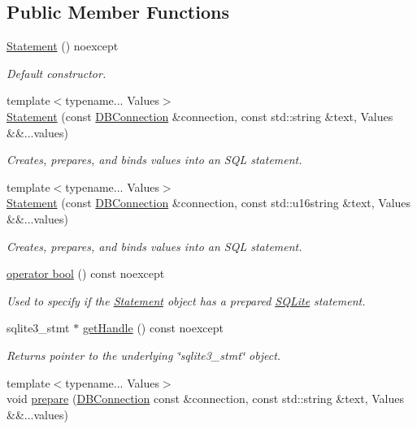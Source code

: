 \subsection*{Public Member Functions}
\begin{DoxyCompactItemize}
\item 
\hyperlink{a00013_a1c724c3934925a5988aa83909857589c}{Statement} () noexcept
\begin{DoxyCompactList}\small\item\em Default constructor. \end{DoxyCompactList}\item 
{\footnotesize template$<$typename... Values$>$ }\\\hyperlink{a00013_ac4f1af971f094f30c445bcc18ffc4e27}{Statement} (const \hyperlink{a00004}{D\-B\-Connection} \&connection, const std\-::string \&text, Values \&\&...values)
\begin{DoxyCompactList}\small\item\em Creates, prepares, and binds values into an S\-Q\-L statement. \end{DoxyCompactList}\item 
{\footnotesize template$<$typename... Values$>$ }\\\hyperlink{a00013_a3857ee340dd2769fafe10259cf4858a3}{Statement} (const \hyperlink{a00004}{D\-B\-Connection} \&connection, const std\-::u16string \&text, Values \&\&...values)
\begin{DoxyCompactList}\small\item\em Creates, prepares, and binds values into an S\-Q\-L statement. \end{DoxyCompactList}\item 
\hyperlink{a00013_a3b7793f1490a321159690cf096ec74d6}{operator bool} () const noexcept
\begin{DoxyCompactList}\small\item\em Used to specify if the \hyperlink{a00013}{Statement} object has a prepared \hyperlink{a00038}{S\-Q\-Lite} statement. \end{DoxyCompactList}\item 
sqlite3\-\_\-stmt $\ast$ \hyperlink{a00013_a9052c143879aca6cf253925336464a8b}{get\-Handle} () const noexcept
\begin{DoxyCompactList}\small\item\em Returns pointer to the underlying \char`\"{}sqlite3\-\_\-stmt\char`\"{} object. \end{DoxyCompactList}\item 
{\footnotesize template$<$typename... Values$>$ }\\void \hyperlink{a00013_a1ecd8e2636b542314521eb68fbf1000e}{prepare} (\hyperlink{a00004}{D\-B\-Connection} const \&connection, const std\-::string \&text, Values \&\&...values)

\end{DoxyCompactItemize}

